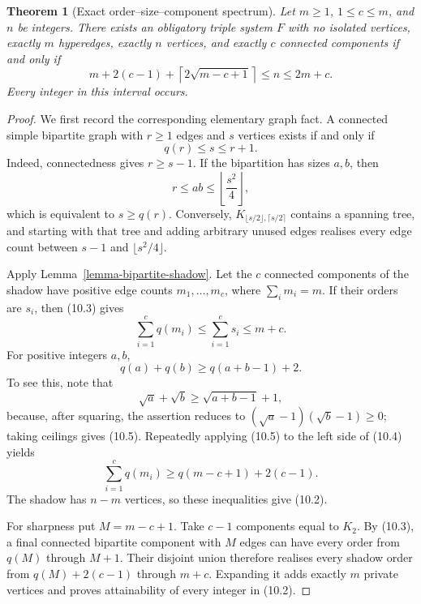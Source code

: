 \documentclass[a4paper,11pt,reqno]{amsart}
\theoremstyle{plain}
\newtheorem{theorem}{Theorem}[section]
\theoremstyle{definition}
\theoremstyle{remark}
\begin{document}
\begin{theorem}[Exact order--size--component spectrum]
\label{theorem-order-size-component-spectrum}
Let $m\ge1$, $1\le c\le m$, and $n$ be integers.  There exists an obligatory
triple system $F$ with no isolated vertices, exactly $m$ hyperedges, exactly
$n$ vertices, and exactly $c$ connected components if and only if
\[
\boxed{
 m+2(c-1)+\left\lceil2\sqrt{m-c+1}\right\rceil
 \le n\le 2m+c.
}
\tag{10.2}
\]
Every integer in this interval occurs.
\end{theorem}
\begin{proof}
We first record the corresponding elementary graph fact.  A connected simple
bipartite graph with $r\ge1$ edges and $s$ vertices exists if and only if
\[
q(r)\le s\le r+1.
\tag{10.3}
\]
Indeed, connectedness gives $r\ge s-1$.  If the bipartition has sizes $a,b$,
then
\[
r\le ab\le\left\lfloor\frac{s^2}{4}\right\rfloor,
\]
which is equivalent to $s\ge q(r)$.  Conversely,
$K_{\lfloor s/2\rfloor,\lceil s/2\rceil}$ contains a spanning tree, and
starting with that tree and adding arbitrary unused edges realises every edge
count between $s-1$ and $\lfloor s^2/4\rfloor$.

Apply Lemma~\ref{lemma-bipartite-shadow}.  Let the $c$ connected components of
the shadow have positive edge counts $m_1,\ldots,m_c$, where
$\sum_i m_i=m$.  If their orders are $s_i$, then (10.3) gives
\[
\sum_{i=1}^c q(m_i)\le \sum_{i=1}^c s_i\le m+c.
\tag{10.4}
\]
For positive integers $a,b$,
\[
q(a)+q(b)\ge q(a+b-1)+2.
\tag{10.5}
\]
To see this, note that
\[
\sqrt a+\sqrt b\ge\sqrt{a+b-1}+1,
\]
because, after squaring, the assertion reduces to
$(\sqrt a-1)(\sqrt b-1)\ge0$; taking ceilings gives (10.5).  Repeatedly
applying (10.5) to the left side of (10.4) yields
\[
\sum_{i=1}^c q(m_i)
\ge q(m-c+1)+2(c-1).
\]
The shadow has $n-m$ vertices, so these inequalities give (10.2).

For sharpness put $M=m-c+1$.  Take $c-1$ components equal to $K_2$.  By
(10.3), a final connected bipartite component with $M$ edges can have every
order from $q(M)$ through $M+1$.  Their disjoint union therefore realises
every shadow order from $q(M)+2(c-1)$ through $m+c$.  Expanding it adds
exactly $m$ private vertices and proves attainability of every integer in
(10.2).
\end{proof}
\end{document}
